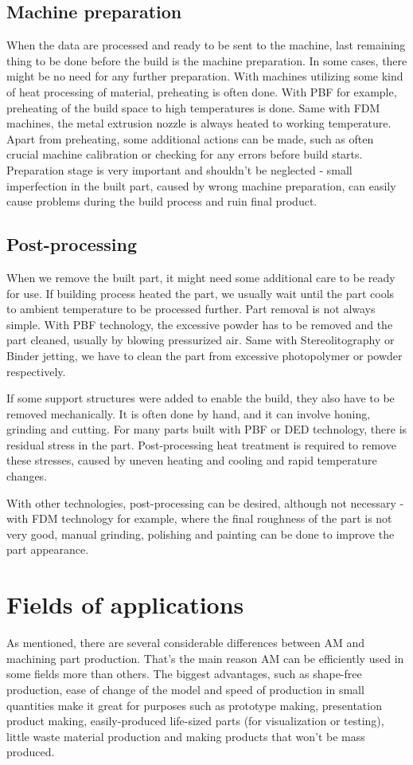 \documentclass[a4paper, twoside, 11pt]{report}
\begin{document}
\subsection{Machine preparation}
When the data are processed and ready to be sent to the machine, last remaining thing to be done before the build is the machine preparation. In some cases, there might be no need for any further preparation. With machines utilizing some kind of heat processing of material, preheating is often done. With PBF for example, preheating of the build space to high temperatures is done. Same with FDM machines, the metal extrusion nozzle is always heated to working temperature. Apart from preheating, some additional actions can be made, such as often crucial machine calibration or checking for any errors before build starts. Preparation stage is very important and shouldn't be neglected - small imperfection in the built part, caused by wrong machine preparation, can easily cause problems during the build process and ruin final product.
\subsection{Post-processing}
When we remove the built part, it might need some additional care to be ready for use. If building process heated the part, we usually wait until the part cools to ambient temperature to be processed further. Part removal is not always simple. With PBF technology, the excessive powder has to be removed and the part cleaned, usually by blowing pressurized air. Same with Stereolitography or Binder jetting, we have to clean the part from excessive photopolymer or powder respectively.

	If some support structures were added to enable the build, they also have to be removed mechanically. It is often done by hand, and it can involve honing, grinding and cutting. For many parts built with PBF or DED technology, there is residual stress in the part. Post-processing heat treatment is required to remove these stresses, caused by uneven heating and cooling and rapid temperature changes.
	
	With other technologies, post-processing can be desired, although not necessary - with FDM technology for example, where the final roughness of the part is not very good, manual grinding, polishing and painting can be done to improve the part appearance.
\section{Fields of applications}
As mentioned, there are several considerable differences between AM and machining part production. That's the main reason AM can be efficiently used in some fields more than others. The biggest advantages, such as shape-free production, ease of change of the model and speed of production in small quantities make it great for purposes such as prototype making, presentation product making, easily-produced life-sized parts (for visualization or testing), little waste material production and making products that won't be mass produced.\\
\end{document}
